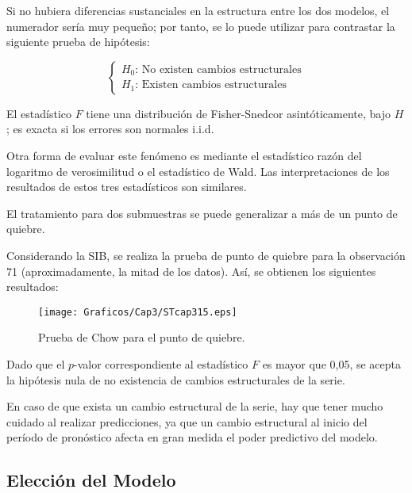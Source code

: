 Si no hubiera diferencias sustanciales en la estructura entre los dos modelos, el numerador ser\'{i}a muy peque\~{n}o; por tanto, se lo puede utilizar para contrastar la siguiente prueba de hip\'{o}tesis:

\[
\left\{ {\begin{array}{l}
 H_{0}\text{: No  existen  cambios  estructurales} \\ 
 H_{1}\text{: Existen  cambios  estructurales}  
 \end{array}} \right.
\]

El estad\'{i}stico $F$ tiene una distribuci\'{o}n de Fisher-Snedcor asint\'{o}ticamente, bajo $H$; es exacta si los errores son normales i.i.d.\newline

Otra forma de evaluar este fen\'{o}meno es mediante el estad\'{i}stico raz\'{o}n del logaritmo de verosimilitud o el estad\'{i}stico de Wald. Las interpretaciones de los resultados de estos tres estad\'{i}sticos son similares.

\begin{observacion}
El tratamiento para dos submuestras se puede generalizar a m\'{a}s de un punto de quiebre. 
\end{observacion}

\begin{ejemplo}
Considerando la SIB, se realiza la prueba de punto de quiebre para la observaci\'{o}n 71 (aproximadamente, la mitad de los datos). As\'{i}, se obtienen los siguientes resultados:

\begin{figure}[H]
\centering
\texttt{[image: Graficos/Cap3/STcap315.eps]}
\caption{Prueba de Chow para el punto de quiebre.}
\end{figure}

Dado que el $p$-valor correspondiente al estad\'{i}stico $F$ es mayor que 0,05, se acepta la hip\'{o}tesis nula de no existencia de cambios estructurales de la serie.
\end{ejemplo}

\begin{observacion}
En caso de que exista un cambio estructural de la serie, hay que tener mucho cuidado al realizar predicciones, ya que un cambio estructural al inicio del per\'{i}odo de pron\'{o}stico afecta en gran medida el poder predictivo del modelo. 
\end{observacion}


\subsection{Elecci\'{o}n del Modelo}


